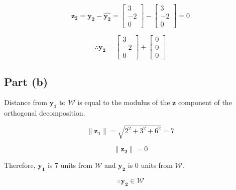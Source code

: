 \documentclass{article}
\begin{document}
\[%
    \mathbf{z_2}
    =
    \mathbf{y_2}-\mathbf{\hat{y_2}}
    =
    \begin{bmatrix}3\\-2\\0\end{bmatrix}
    -
    \begin{bmatrix}3\\-2\\0\end{bmatrix}
    =
    0
\]%

\[%
     \therefore \mathbf{y_2} = 
     \begin{bmatrix}3\\-2\\0\end{bmatrix}
     +
     \begin{bmatrix}0\\0\\0\end{bmatrix}
\]%

\subsection{Part (b)} 
Distance from $\mathbf{y_1}$ to $\mathcal{W}$ is equal to the modulus of the $\mathbf{z}$
component of the orthogonal decomposition.

 

\[%
    \|\mathbf{z_1}\|
    =
    \sqrt{2^{2}+3^{2}+6^{2}}
    =
    7
\]%

\[%
    \|\mathbf{z_2}\|
    =
    0
\]%

Therefore, $\mathbf{y_1}$ is 7 units from $\mathcal{W}$ and $\mathbf{y_2}$ is 0
units from $\mathcal{W}$. 

\[%
     \therefore \mathbf{y_2}
     \in 
     \mathcal{W}
\]%
\end{document}
